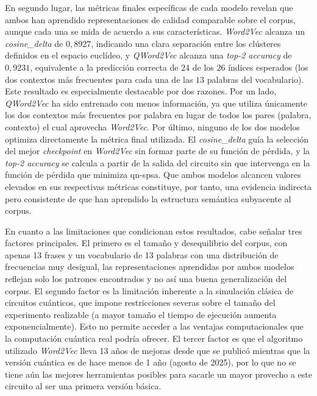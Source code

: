 En segundo lugar, las métricas finales específicas de cada modelo revelan que ambos han aprendido representaciones de calidad comparable sobre el corpus, aunque cada una se mida de acuerdo a sus características. \textit{Word2Vec} alcanza un \textit{cosine\_delta} de $0{,}8927$, indicando una clara separación entre los clústeres definidos en el espacio euclídeo, y \textit{QWord2Vec} alcanza una \textit{top-2 accuracy} de $0{,}9231$, equivalente a la predicción correcta de $24$ de los $26$ índices esperados (los dos contextos más frecuentes para cada una de las $13$ palabras del vocabulario). Este resultado es especialmente destacable por dos razones. Por un lado, \textit{QWord2Vec} ha sido entrenado con menos información, ya que utiliza únicamente los dos contextos más frecuentes por palabra en lugar de todos los pares (palabra, contexto) el cual aprovecha \textit{Word2Vec}. Por último, ninguno de los dos modelos optimiza directamente la métrica final utilizada. El \textit{cosine\_delta} guía la selección del mejor \textit{checkpoint} en \textit{Word2Vec} sin formar parte de su función de pérdida, y la \textit{top-2 accuracy} se calcula a partir de la salida del circuito sin que intervenga en la función de pérdida que minimiza \gls{qn-spsa}. Que ambos modelos alcancen valores elevados en sus respectivas métricas constituye, por tanto, una evidencia indirecta pero consistente de que han aprendido la estructura semántica subyacente al corpus.

En cuanto a las limitaciones que condicionan estos resultados, cabe señalar tres factores principales. El primero es el tamaño y desequilibrio del corpus, con apenas 13 frases y un vocabulario de 13 palabras con una distribución de frecuencias muy desigual, las representaciones aprendidas por ambos modelos reflejan solo los patrones encontrados y no así una buena generalización del corpus. El segundo factor es la limitación inherente a la simulación clásica de circuitos cuánticos, que impone restricciones severas sobre el tamaño del experimento realizable (a mayor tamaño el tiempo de ejecución aumenta exponencialmente). Esto no permite acceder a las ventajas computacionales que la computación cuántica real podría ofrecer. El tercer factor es que el algoritmo utilizado \textit{Word2Vec} lleva 13 años de mejoras desde que se publicó mientras que la versión cuántica es de hace menos de 1 año (agosto de 2025), por lo que no se tiene aún las mejores herramientas posibles para sacarle un mayor provecho a este circuito al ser una primera versión básica.

